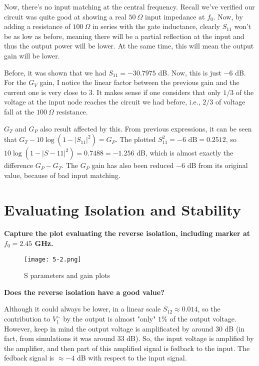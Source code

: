 \noindent Now, there's no input matching at the central frequency. Recall we've verified our circuit was quite good at showing a real $50 \ \Omega$ input impedance at $f_0$. Now, by adding a resistance of $100 \ \Omega$ in series with the gate inductance, clearly $S_{11}$ won't be as low as before, meaning there will be a partial reflection at the input and thus the output power will be lower. At the same time, this will mean the output gain will be lower.

\noindent Before, it was shown that we had $S_{11} = -30.7975$ dB. Now, this is just $-6$ dB. For the $G_V$ gain, I notice the linear factor between the previous gain and the current one is very close to $3$. It makes sense if one considers that only $1/3$ of the voltage at the input node reaches the circuit we had before, i.e., $2/3$ of voltage fall at the $100 \ \Omega$ resistance. 

\noindent $G_T$ and $G_P$ also result affected by this. From previous expressions, it can be seen that $G_T - 10 \log(1 - |S_{11}|^2) = G_P$. The plotted $S_{11}^2 = -6 \text{ dB} = 0.2512$, so $10 \log(1- |S-{11}|^2) = 0.7488 = -1.256$ dB, which is almost exactly the difference $G_P - G_T$. The $G_P$ gain has also been reduced $-6$ dB from its original value, because of bad input matching.  





\section{Evaluating Isolation and Stability}
\begin{pexbox}{}
   \noindent \textbf{Capture the plot evaluating the reverse isolation, including marker at $f_0 = 2.45$ GHz.}
\end{pexbox}

\begin{figure} [H] \centering
   \texttt{[image: 5-2.png]}
   \caption{S parameters and gain plots}
\end{figure}


\begin{pexbox}{}
   \noindent \textbf{Does the reverse isolation have a good value?}
\end{pexbox}

   \noindent Although it could always be lower, in a linear scale $S_{12} \approx 0.014$, so the contribution to $V_{1}^-$ by the output is almost "only" $1$\% of the output voltage. However, keep in mind the output voltage is amplificated by around $30$ dB (in fact, from simulations it was around $33$ dB). So, the input voltage is amplified by the amplifier, and then part of this amplified signal is fedback to the input. The fedback signal is $\approx -4$ dB with respect to the input signal.
   
